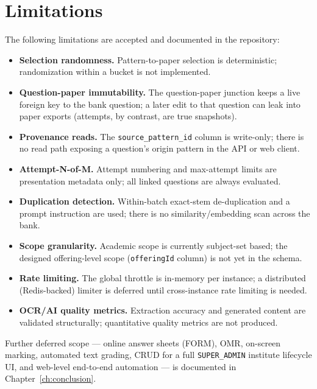 \section{Limitations}

\noindent The following limitations are accepted and documented in the
repository:

\begin{itemize}
  \item \textbf{Selection randomness.} Pattern-to-paper selection is
  deterministic; randomization within a bucket is not implemented.
  \item \textbf{Question-paper immutability.} The question-paper junction
  keeps a live foreign key to the bank question; a later edit to that question
  can leak into paper exports (attempts, by contrast, are true snapshots).
  \item \textbf{Provenance reads.} The \texttt{source\_pattern\_id} column is
  write-only; there is no read path exposing a question's origin pattern in the
  API or web client.
  \item \textbf{Attempt-N-of-M.} Attempt numbering and max-attempt limits are
  presentation metadata only; all linked questions are always evaluated.
  \item \textbf{Duplication detection.} Within-batch exact-stem de-duplication
  and a prompt instruction are used; there is no similarity/embedding scan
  across the bank.
  \item \textbf{Scope granularity.} Academic scope is currently subject-set
  based; the designed offering-level scope (\texttt{offeringId} column) is
  not yet in the schema.
  \item \textbf{Rate limiting.} The global throttle is in-memory per instance;
  a distributed (Redis-backed) limiter is deferred until cross-instance
  rate limiting is needed.
  \item \textbf{OCR/AI quality metrics.} Extraction accuracy and generated
  content are validated structurally; quantitative quality metrics are not
  produced.
\end{itemize}

Further deferred scope --- online answer sheets (FORM), OMR, on-screen
marking, automated text grading, CRUD for a full \texttt{SUPER\_ADMIN}
institute lifecycle UI, and web-level end-to-end automation --- is documented
in Chapter~\ref{ch:conclusion}.